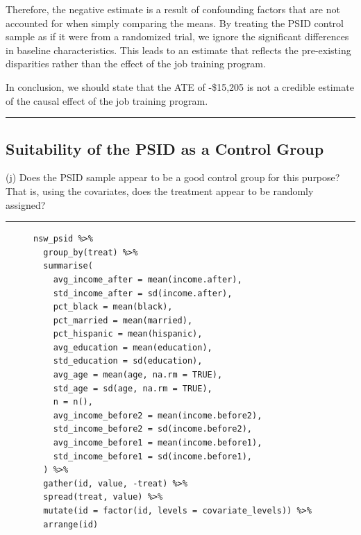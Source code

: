 \documentclass{article}
\newenvironment{colorparagraph}[1]{\par\color{#1}}{\par}
\begin{document}
Therefore, the negative estimate is a result of confounding factors that are not accounted for when simply comparing the means. By treating the PSID control sample as if it were from a randomized trial, we ignore the significant differences in baseline characteristics. This leads to an estimate that reflects the pre-existing disparities rather than the effect of the job training program.

In conclusion, we should state that the ATE of -\$15,205 is not a credible estimate of the causal effect of the job training program.

\newpage

\begin{colorparagraph}{questioncolor}
\rule{\textwidth}{0.5pt}

\label{q4j}\subsection{Suitability of the PSID as a Control Group}
(j) Does the PSID sample appear to be a good control group for this purpose? That is, using the covariates, does the treatment appear to be randomly assigned?

\rule{\textwidth}{0.5pt}
\end{colorparagraph}

\begin{figure}[H]
\centering
\begin{lstlisting}[style=Rstyle, caption=Data Statistics Code]
nsw_psid %>% 
  group_by(treat) %>% 
  summarise(
    avg_income_after = mean(income.after),
    std_income_after = sd(income.after),
    pct_black = mean(black),
    pct_married = mean(married),
    pct_hispanic = mean(hispanic),
    avg_education = mean(education),
    std_education = sd(education),
    avg_age = mean(age, na.rm = TRUE),
    std_age = sd(age, na.rm = TRUE),
    n = n(),
    avg_income_before2 = mean(income.before2),
    std_income_before2 = sd(income.before2),
    avg_income_before1 = mean(income.before1),
    std_income_before1 = sd(income.before1),
  ) %>% 
  gather(id, value, -treat) %>% 
  spread(treat, value) %>% 
  mutate(id = factor(id, levels = covariate_levels)) %>% 
  arrange(id)
\end{lstlisting}
\end{figure}
\end{document}
